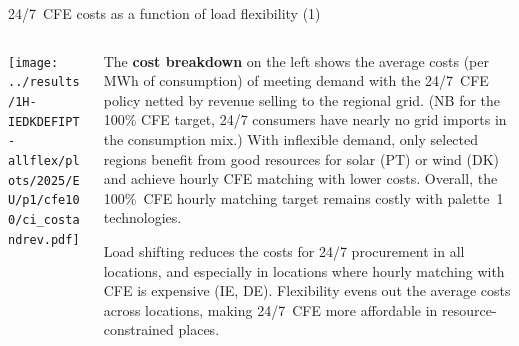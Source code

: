 \begin{frame}{24/7~CFE costs as a function of load flexibility (1)}

  {\footnotesize
  \vspace{0.2cm}
  
  \begin{columns}[T]
  \begin{column}{9cm}
  \centering
  \texttt{[image: ../results/1H-IEDKDEFIPT-allflex/plots/2025/EU/p1/cfe100/ci\_costandrev.pdf]}
  \end{column}

  \begin{column}{6cm}
  The {\bf cost breakdown} on the left shows the average costs (per MWh of consumption) of meeting demand with the 24/7~CFE policy netted by revenue selling to the regional grid. (NB for the 100\% CFE target, 24/7 consumers have nearly no grid imports in the consumption mix.) With inflexible demand, only selected regions benefit from good resources for solar (PT) or wind (DK) and achieve hourly CFE matching with lower costs. Overall, the 100\%~CFE hourly matching target remains costly with palette~1 technologies.

  \vspace{0.1cm}
  \alert{Load shifting reduces the costs for 24/7 procurement in all locations}, and especially in locations where hourly matching with CFE is expensive (IE, DE). Flexibility evens out the average costs across locations, making 24/7~CFE more affordable in resource-constrained places.

  \end{column}
  \end{columns}
  }
\end{frame}
  


